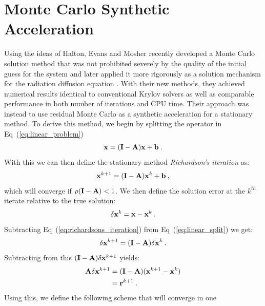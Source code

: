 \section{Monte Carlo Synthetic Acceleration}
\label{sec:mcsa}
Using the ideas of Halton, Evans and Mosher recently developed a Monte
Carlo solution method that was not prohibited severely by the quality
of the initial guess for the system \cite{evans_monte_2009} and later
applied it more rigorously as a solution mechanism for the radiation
diffusion equation \cite{evans_monte_2012}. With their new methods,
they achieved numerical results identical to conventional Krylov
solvers as well as comparable performance in both number of iterations
and CPU time. Their approach was instead to use residual Monte Carlo
as a synthetic acceleration for a stationary method. To derive this
method, we begin by splitting the operator in
Eq~(\ref{eq:linear_problem})
\begin{equation}
  \mathbf{x} = (\mathbf{I} - \mathbf{A})\mathbf{x} + \mathbf{b}\:.
  \label{eq:linear_split}
\end{equation}
With this we can then define the stationary method
\textit{Richardson's iteration} as:
\begin{equation}
  \mathbf{x}^{k+1} = (\mathbf{I} - \mathbf{A})\mathbf{x}^k + \mathbf{b}\:,
  \label{eq:richardsons_iteration}
\end{equation}
which will converge if $\rho(\mathbf{I} - \mathbf{A}) < 1$. We then define the
solution error at the $k^{th}$ iterate relative to the true solution:
\begin{equation}
  \delta \mathbf{x}^k = \mathbf{x} - \mathbf{x}^k\:.
  \label{eq:mcsa_error}
\end{equation}
Subtracting Eq~(\ref{eq:richardsons_iteration}) from
Eq~(\ref{eq:linear_split}) we get:
\begin{equation}
  \delta \mathbf{x}^{k+1} = (\mathbf{I} - \mathbf{A})\delta \mathbf{x}^k\:.
  \label{eq:mcsa_setup_1}
\end{equation}
Subtracting from this $(\mathbf{I} - \mathbf{A})\delta \mathbf{x}^{k+1}$ yields:
\begin{equation}
  \begin{split}
    \mathbf{A}\delta \mathbf{x}^{k+1} &= (\mathbf{I} -
    \mathbf{A})(\mathbf{x}^{k+1}-\mathbf{x}^{k}) \\ &= \mathbf{r}^{k+1}\:.
    \label{eq:mcsa_setup_2}
  \end{split}
\end{equation}
Using this, we define the following scheme that will converge in one
